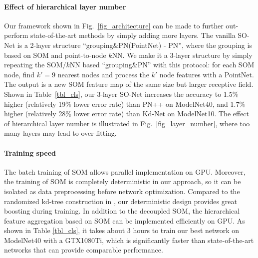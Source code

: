 \documentclass[10pt,twocolumn,letterpaper]{article}
\begin{document}
\paragraph{Effect of hierarchical layer number}
Our framework shown in Fig.~\ref{fig_architecture} can be made to further out-perform state-of-the-art methods by simply adding more layers. The vanilla SO-Net is a 2-layer structure ``grouping\&PN(PointNet) - PN'', where the grouping is based on SOM and point-to-node $k$NN. We make it a 3-layer structure by simply repeating the SOM/$k$NN based ``grouping\&PN'' with this protocol: for each SOM node, find $k'=9$ nearest nodes and process the $k'$ node features with a PointNet. The output is a new SOM feature map of the same size but larger receptive field. Shown in Table~\ref{tbl_cls}, our 3-layer SO-Net increases the accuracy to 1.5\% higher (relatively 19\% lower error rate) than PN++ on ModelNet40, and 1.7\% higher (relatively 28\% lower error rate) than Kd-Net on ModelNet10. The effect of hierarchical layer number is illustrated in Fig.~\ref{fig_layer_number}, where too many layers may lead to over-fitting.

\paragraph{Training speed}
The batch training of SOM allows parallel implementation on GPU. Moreover, the training of SOM is completely deterministic in our approach, so it can be isolated as data preprocessing before network optimization. Compared to the randomized kd-tree construction in \cite{klokov2017escape}, our deterministic design provides great boosting during training. In addition to the decoupled SOM, the hierarchical feature aggregation based on SOM can be implemented efficiently on GPU. As shown in Table \ref{tbl_cls}, it takes about 3 hours to train our best network on ModelNet40 with a GTX1080Ti, which is significantly faster than state-of-the-art networks that can provide comparable performance.
\end{document}
